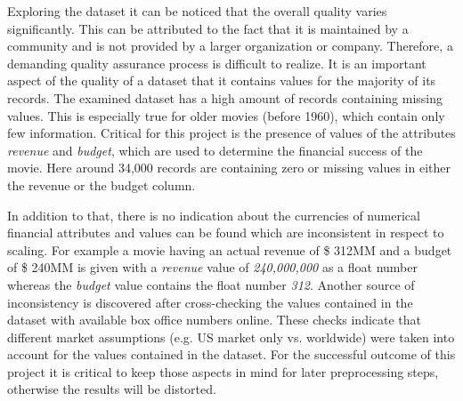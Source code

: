 Exploring the dataset it can be noticed that the overall quality varies significantly. This can be attributed to the fact that it is maintained by a community and is not provided by a larger organization or company. Therefore, a demanding quality assurance process is difficult to realize. It is an important aspect of the quality of a dataset that it contains values for the majority of its records. The examined dataset has a high amount of records containing missing values. This is especially true for older movies (before 1960), which contain only few information. Critical for this project is the presence of values of the attributes \textit{revenue} and \textit{budget}, which are used to determine the financial success of the movie. Here around 34,000 records are containing zero or missing values in either the revenue or the budget column.

In addition to that, there is no indication about the currencies of numerical financial attributes and values can be found which are inconsistent in respect to scaling. For example a movie having an actual revenue of \$ 312MM and a budget of \$ 240MM is given with a \textit{revenue} value of \textit{240,000,000} as a float number whereas the \textit{budget} value contains the float number \textit{312}. Another source of inconsistency is discovered after cross-checking the values contained in the dataset with available box office numbers online. These checks indicate that different market assumptions (e.g. US market only vs. worldwide) were taken into account for the values contained in the dataset. For the successful outcome of this project it is critical to keep those aspects in mind for later preprocessing steps, otherwise the results will be distorted.

